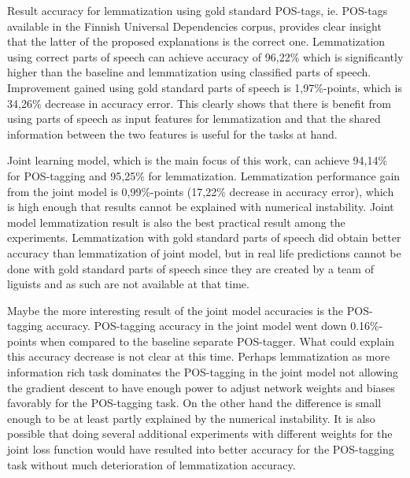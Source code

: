 \documentclass[12pt,a4paper,english
]{tutthesis}
\begin{document}
Result accuracy for lemmatization using gold standard POS-tags, ie. POS-tags available in the Finnish Universal Dependencies corpus, provides clear insight that the latter of the proposed explanations is the correct one. Lemmatization using correct parts of speech can achieve accuracy of 96,22\% which is significantly higher than the baseline and lemmatization using classified parts of speech. Improvement gained using gold standard parts of speech is 1,97\%-points, which is 34,26\% decrease in accuracy error. This clearly shows that there is benefit from using parts of speech as input features for lemmatization and that the shared information between the two features is useful for the tasks at hand.

Joint learning model, which is the main focus of this work, can achieve 94,14\% for POS-tagging and 95,25\% for lemmatization. Lemmatization performance gain from the joint model is 0,99\%-points (17,22\% decrease in accuracy error), which is high enough that results cannot be explained with numerical instability. Joint model lemmatization result is also the best practical result among the experiments. Lemmatization with gold standard parts of speech did obtain better accuracy than lemmatization of joint model, but in real life predictions cannot be done with gold standard parts of speech since they are created by a team of liguists and as such are not available at that time.

Maybe the more interesting result of the joint model accuracies is the POS-tagging accuracy. POS-tagging accuracy in the joint model went down 0.16\%-points when compared to the baseline separate POS-tagger. What could explain this accuracy decrease is not clear at this time. Perhaps lemmatization as more information rich task dominates the POS-tagging in the joint model not allowing the gradient descent to have enough power to adjust network weights and biases favorably for the POS-tagging task. On the other hand the difference is small enough to be at least partly explained by the numerical instability. It is also possible that doing several additional experiments with different weights for the joint loss function would have resulted into better accuracy for the POS-tagging task without much deterioration of lemmatization accuracy.
\end{document}
